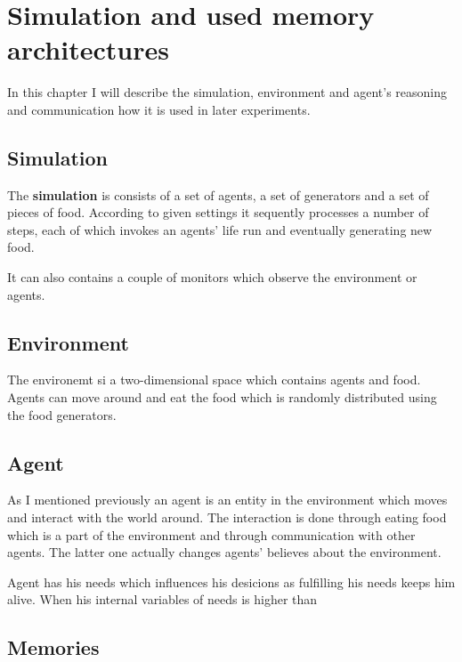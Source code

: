 \chapter{Simulation and used memory architectures}

In this chapter I will describe the simulation, environment and agent's reasoning and communication how it is used in later experiments. 

\section{Simulation}

The {\bf simulation} is consists of a set of agents, a set of generators and a set of pieces of food. According to given settings it sequently processes a number of steps, each of which invokes an agents' life run and eventually generating new food.

It can also contains a couple of monitors which observe the environment or agents.

\section{Environment}

The environemt si a two-dimensional space which contains agents and food. Agents can move around and eat the food which is randomly distributed using the food generators. 

\section{Agent}

As I mentioned previously an agent is an entity in the environment which moves and interact with the world around. The interaction is done through eating food which is a part of the environment and through communication with other agents. The latter one actually changes agents' believes about the environment.

Agent has his needs which influences his desicions as fulfilling his needs keeps him alive. When his internal variables of needs is higher than    

\section{Memories}